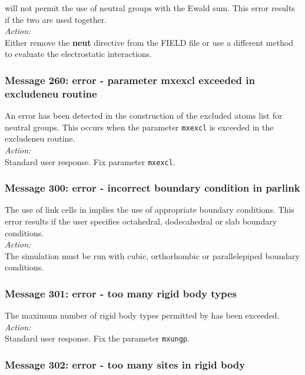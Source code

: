 \D{} will not permit the use of neutral groups with the Ewald
sum.  This
error results if the two are used together. \\

\noindent
{\em Action:} \\
Either remove the {\bf neut} directive from the FIELD file or use a different
method to evaluate the electrostatic interactions. 

\subsubsection*{Message 260: error - parameter mxexcl exceeded in 
excludeneu routine}

An error has been detected in the construction of the excluded atoms
list for neutral groups. This occurs when the parameter {\tt mxexcl} is
exceeded in the {\sc excludeneu} routine. \\

\noindent
{\em Action:}\\ Standard user response. Fix parameter {\tt mxexcl}.

\subsubsection*{Message 300: error - incorrect boundary condition in
parlink}

The use of link cells in \D{} implies the use of appropriate boundary
conditions. This error results if the user specifies octahedral,
dodecahedral or slab  boundary conditions. \\

\noindent
{\em Action:}\\
The simulation must be run with cubic, orthorhombic or parallelepiped
 boundary conditions.

\subsubsection*{Message 301: error - too many rigid body types}

The maximum number of rigid body  types permitted by \D{} has been
exceeded.\\

\noindent
{\em Action:}\\
Standard user response. Fix the parameter {\tt mxungp}.

\subsubsection*{Message 302: error - too many sites in rigid body}

